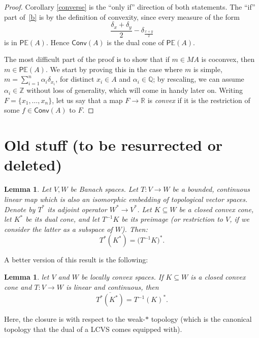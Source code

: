 \documentclass[a4paper,12pt]{scrartcl}
\numberwithin{equation}{section}
\theoremstyle{plain}
\newtheorem{lemma}[thm]{Lemma}
\theoremstyle{definition}
\newcommand{\Z}{\mathbb{Z}}
\newcommand{\Q}{\mathbb{Q}}
\newcommand{\R}{\mathbb{R}}
\DeclareMathOperator{\1}{\mathbbm{1}}
\DeclareMathOperator{\2}{\mathbbm{2}}
\newcommand{\E}{\mathbb{E}}
\newcommand{\Conv}{\mathsf{Conv}} %
\newcommand{\PCM}{\mathsf{P}\E} %
\begin{document}
\begin{proof}
Corollary \ref{converse} is the ``only if'' direction of both statements. The ``if'' part of~\ref{b} is by the definition of convexity, since every measure of the form
\[
	\frac{\delta_x + \delta_y}{2} - \delta_{\frac{x+y}{2}}
\]
is in $\PCM(A)$. Hence $\Conv(A)$ is the dual cone of $\PCM(A)$.

The most difficult part of the proof is to show that if $m\in MA$ is coconvex, then $m\in\PCM(A)$. We start by proving this in the case where $m$ is simple, $m = \sum_{i=1}^n \alpha_i \delta_{x_i}$, for distinct $x_i\in A$ and $\alpha_i\in\Q$; by rescaling, we can assume $\alpha_i\in\Z$ without loss of generality, which will come in handy later on. Writing $F = \{x_1,\ldots,x_n\}$, let us say that a map $F\to\R$ is \emph{convex} if it is the restriction of some $f\in\Conv(A)$ to $F$. 
\end{proof}



\appendix

\section{Old stuff (to be resurrected or deleted)}

\begin{lemma}\label{dualcone}
 Let $V,W$ be Banach spaces. Let $T:V\to W$ be a bounded, continuous linear map which is also an isomorphic embedding of topological vector spaces. 
 Denote by $T^*$ its adjoint operator $W^*\to V^*$.
 Let $K\subseteq W$ be a closed convex cone, let $K^*$ be its dual cone, and let $T^{-1}K$ be its preimage (or restriction to $V$, if we consider the latter as a subspace of $W$).
 Then:
 \begin{equation}\label{TKTK}
  T^*(K^*) = \big( T^{-1}K \big)^*.
 \end{equation}
\end{lemma}

A better version of this result is the following:

\begin{lemma}
let $V$ and $W$ be locally convex spaces. If $K\subseteq W$ is a closed convex cone and $T : V\to W$ is linear and continuous, then
\[
	\overline{T^*(K^*)} = T^{-1}(K)^*.
\]
\end{lemma}

Here, the closure is with respect to the weak-$*$ topology (which is the canonical topology that the dual of a LCVS comes equipped with).
\end{document}
